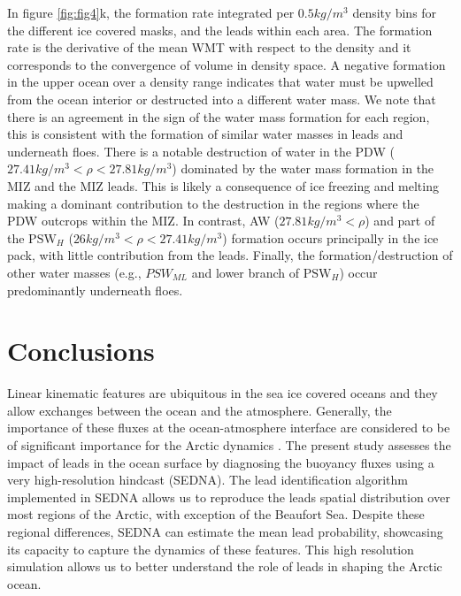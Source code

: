\documentclass[lineno,sn-basic]{sn-jnl}%
\begin{document}
In figure \ref{fig:fig4}k, the formation rate integrated per $0.5 kg/m^{3}$ density bins for the different ice covered masks, and the leads within each area. The formation rate is the derivative of the mean WMT with respect to the density and it corresponds to the convergence of volume in density space. A negative formation in the upper ocean over a density range indicates that water must be upwelled from the ocean interior or destructed into a different water mass.  We note that there is an agreement in the sign of the water mass formation for each region, this is consistent with the formation of similar water masses in leads and underneath floes. There is a notable destruction of water in the PDW ($27.41 kg/m^3 < \rho < 27.81 kg/m^3$) dominated by the water mass formation in the MIZ and the MIZ leads. This is likely a consequence of ice freezing and melting making a dominant contribution to the destruction in the regions where the PDW outcrops within the MIZ. In contrast, AW ($27.81 kg/m^3 < \rho $) and part of the $\text{PSW}_H$ ($26 kg/m^3 < \rho < 27.41 kg/m^3$) formation occurs principally in the ice pack, with little contribution from the leads. 
Finally, the formation/destruction of other water masses (e.g., $PSW_{ML}$ and lower branch of $\text{PSW}_H$) occur predominantly underneath floes. 

\section{Conclusions}

Linear kinematic features are ubiquitous in the sea ice covered oceans and they allow exchanges between the ocean and the atmosphere. Generally, the importance of these fluxes at the ocean-atmosphere interface are considered to be of significant importance for the Arctic dynamics \citep{Maykut_solar_1995}. The present study assesses the impact of leads in the ocean surface by diagnosing the buoyancy fluxes using a very high-resolution hindcast (SEDNA). The lead identification algorithm implemented in SEDNA allows us to reproduce the leads spatial distribution over most regions of the Arctic, with exception of the Beaufort Sea. Despite these regional differences, SEDNA can estimate the mean lead probability, showcasing its capacity to capture the dynamics of these features. This high resolution simulation allows us to better understand the role of leads in shaping the Arctic ocean.
\end{document}
